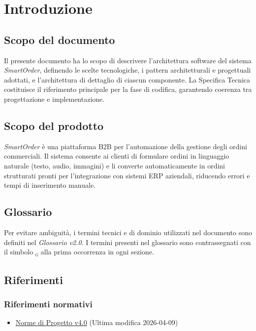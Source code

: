 \documentclass[a4paper, 11pt, oneside]{scrartcl}
\begin{document}
\newpage
\section{Introduzione}

\subsection{Scopo del documento}
Il presente documento ha lo scopo di descrivere l'architettura software del sistema \textit{SmartOrder}, definendo le scelte tecnologiche, i pattern architetturali e progettuali adottati, e l'architettura di dettaglio di ciascun componente.
La Specifica Tecnica costituisce il riferimento principale per la fase di codifica, garantendo coerenza tra progettazione e implementazione.

\subsection{Scopo del prodotto}
\textit{SmartOrder} \`e una piattaforma B2B per l'automazione della gestione degli ordini commerciali. Il sistema consente ai clienti di formulare ordini in linguaggio naturale (testo, audio, immagini) e li converte automaticamente in ordini strutturati pronti per l'integrazione con sistemi ERP aziendali, riducendo errori e tempi di inserimento manuale.

\subsection{Glossario}
Per evitare ambiguit\`a, i termini tecnici e di dominio utilizzati nel documento sono definiti nel \textit{Glossario v2.0}.
I termini presenti nel glossario sono contrassegnati con il simbolo \textsubscript{\textsc{g}} alla prima occorrenza in ogni sezione.

\subsection{Riferimenti}

\subsubsection{Riferimenti normativi}
\begin{itemize}
    \item \href{https://swenightpro.github.io/Documentazione/docs/PB/Documentazione%20Interna/Norme_Di_Progetto.pdf}{Norme di Progetto v4.0} (Ultima modifica 2026-04-09)
\end{itemize}
\end{document}
